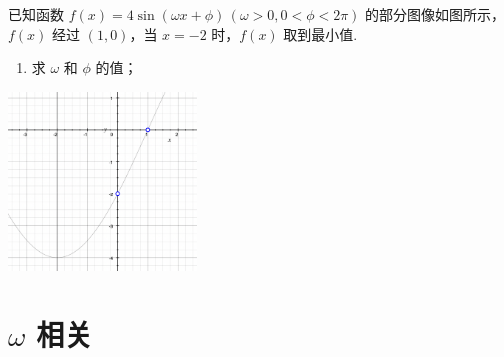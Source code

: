 \documentclass[a4paper , final]{ctexart}
\newenvironment{problemwithfig}[3][2cm]{%
  \item #2
  \par\noindent
  \begin{minipage}[t][8cm][b]{\linewidth}
    \vfill
    \hfill #3
    \par\vspace{#1} %
  \end{minipage}
}{}
\begin{document}
\begin{problems}
  \newpage
  \begin{problemwithfig}[5cm]
    {
      已知函数 $f(x) = 4\sin(\omega x + \phi)\,(\omega > 0, 0 < \phi < 2\pi)$ 的部分图像如图所示，$f(x)$ 经过 $(1, 0)$，当 $x = -2$ 时，$f(x)$ 取到最小值.
      \begin{enumerate}[label=(\arabic*)]
        \item 求 $\omega$ 和 $\phi$ 的值；
      \end{enumerate}
    }
    {
      \includegraphics[width=5cm]{Snipaste_2025-07-23_08-50-31.png}
    }
  \end{problemwithfig}

\end{problems}


\newpage
\section*{$\omega$ 相关}
\end{document}
